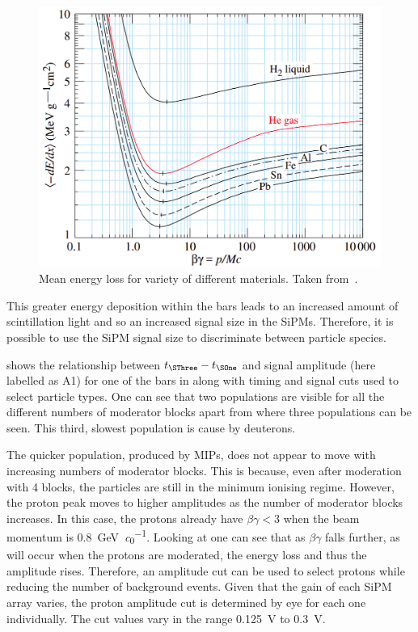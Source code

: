 \begin{figure}[h]
  \centering
  \includegraphics[width=.6\linewidth]{files/figures/hptpc_beam_flux/energyLoss}
  \caption[Mean energy loss for a variety of different materials.]{Mean energy loss for variety of different materials. Taken from~\cite{pdg2020}.}
  \label{fig:energyLoss}
\end{figure}

This greater energy deposition within the bars leads to an increased amount of scintillation light and so an increased signal size in the SiPMs.
Therefore, it is possible to use the SiPM signal size to discriminate between particle species.

 shows the relationship between $t_{\SThree} - t_{\SOne}$ and signal amplitude (here labelled as A1) for one of the bars in \SThree along with timing and signal cuts used to select particle types.
One can see that two populations are visible for all the different numbers of moderator blocks apart from  where three populations can be seen.
This third, slowest population is cause by deuterons.

The quicker population, produced by MIPs, does not appear to move with increasing numbers of moderator blocks.
This is because, even after moderation with 4 blocks, the particles are still in the minimum ionising regime.
However, the proton peak moves to higher amplitudes as the number of moderator blocks increases.
In this case, the protons already have $\beta\gamma < 3$ when the beam momentum is \SI{0.8}{\giga\electronvolt\per\clight}.
Looking at  one can see that as $\beta\gamma$ falls further, as will occur when the protons are moderated, the energy loss and thus the amplitude rises.
Therefore, an amplitude cut can be used to select protons while reducing the number of background events.
Given that the gain of each SiPM array varies, the proton amplitude cut is determined by eye for each one individually.
The cut values vary in the range \SI{0.125}{\volt} to \SI{0.3}{\volt}.

